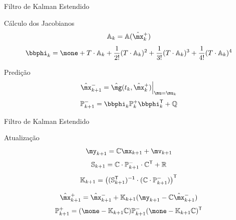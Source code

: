 \documentclass[25pt,landscape]{beamer}
\begin{document}
\begin{frame}{Filtro de Kalman Estendido}
    \begin{block}{C\'alculo dos Jacobianos}
		\begin{equation}
			\mA_{k} = \mA(\hat{\mx}_k^+)
		\end{equation}
		\begin{equation}
			\mphi_{k} =  \mone + T \cdot \mA_k + \frac{1}{2!}(T \cdot \mA_k)^2 + \frac{1}{3!}(T \cdot \mA_k)^3 + \frac{1}{4!}(T \cdot \mA_k)^4
		\end{equation}
    \end{block}
    \begin{block}{Predi\c{c}\~ao}
		\begin{equation}
			\hat{\mx}_{k+1}^- = \hat{\mg}(t_k, \hat{\mx}_k^+)\Big|_{\mu = \mu_k}
		\end{equation}
		\begin{equation}
			\mP_{k+1}^- = \mphi_{k} \mP_{k}^+ \mphi_{k}^\msT + \mQ
		\end{equation}
    \end{block}
\end{frame}

\begin{frame}{Filtro de Kalman Estendido}
    \begin{block}{Atualiza\c{c}\~ao}
		\begin{equation}
			\my_{k+1} = \mC \mx_{k+1} + \mv_{k+1}
		\end{equation}
		\begin{equation}
			\mathbb{S}_{k+1} = \mathbb{C} \cdot \mathbb{P}_{k+1}^- \cdot \mathbb{C}^{\mathsf{T}} + \mathbb{R}
		\end{equation}
		\begin{equation}
			\mathbb{K}_{k+1} = \left( ( \mathbb{S}_{k+1}^{\mathsf{T}})^{\mathsf{-1}}  \cdot  ( \mathbb{C} \cdot \mathbb{P}_{k+1}^- ) \right)^{\mathsf{T}}
		\end{equation}

		\begin{equation}
			\hat{\mx}_{k+1}^+ =  \hat{\mx}_{k+1}^- + \mK_{k+1}(\my_{k+1} - \mC \hat{\mx}_{k+1}^-)
		\end{equation}
		\begin{equation}
			\mP_{k+1}^+ =  (\mone - \mK_{k+1} \mC) \mP_{k+1}^- (\mone - \mK_{k+1} \mC)^\msT
		\end{equation}
    \end{block}
\end{frame}
\end{document}
